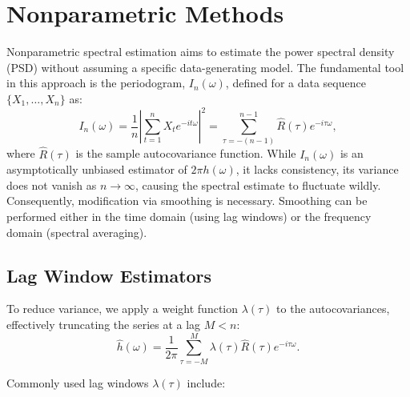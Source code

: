 \documentclass[twoside]{article}
\begin{document}
\section{Nonparametric Methods}
Nonparametric spectral estimation aims to estimate the power spectral density (PSD) without assuming a specific data-generating model. The fundamental tool in this approach is the periodogram, $I_n(\omega)$, defined for a data sequence $\{X_1, \ldots, X_n\}$ as:
\begin{equation}
I_n(\omega) = \frac{1}{n} \left| \sum_{t=1}^n X_t e^{-it\omega} \right|^2 = \sum_{\tau = -(n-1)}^{n-1} \widehat{R}(\tau) e^{-i\tau \omega},
\end{equation}
where $\widehat{R}(\tau)$ is the sample autocovariance function. While $I_n(\omega)$ is an asymptotically unbiased estimator of $2\pi h(\omega)$, it lacks consistency, its variance does not vanish as $n \to \infty$, causing the spectral estimate to fluctuate wildly. Consequently, modification via smoothing is necessary. Smoothing can be performed either in the time domain (using lag windows) or the frequency domain (spectral averaging).



\subsection{Lag Window Estimators}



To reduce variance, we apply a weight function $\lambda(\tau)$ to the autocovariances, effectively truncating the series at a lag $M < n$:
\begin{equation}
\widehat{h}(\omega) = \frac{1}{2\pi} \sum_{\tau=-M}^{M} \lambda(\tau) \widehat{R}(\tau) e^{-i\tau \omega}.
\end{equation}



Commonly used lag windows $\lambda(\tau)$ include:
\end{document}
